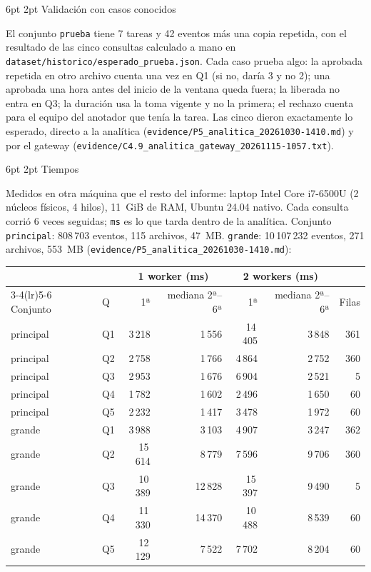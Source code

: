 \documentclass[10pt,letterpaper]{article}
\makeatletter
\newcommand{\ev}[1]{{\footnotesize\texttt{evidence/\allowbreak #1}}}
\renewcommand\subsection{\@startsection{subsection}{2}{\z@}%
  {6pt \@plus 1pt}{2pt}%
  {\normalfont\normalsize\bfseries\color{acc}}}
\makeatother
\begin{document}
\subsection{Validación con casos conocidos}

El conjunto \texttt{prueba} tiene 7 tareas y 42 eventos más una copia repetida, con el resultado de las cinco
consultas calculado a mano en \texttt{dataset/historico/esperado\_prueba.json}. Cada caso prueba algo: la
aprobada repetida en otro archivo cuenta una vez en Q1 (si no, daría 3 y no 2); una aprobada una hora antes del
inicio de la ventana queda fuera; la liberada no entra en Q3; la duración usa la toma vigente y no la primera;
el rechazo cuenta para el equipo del anotador que tenía la tarea. Las cinco dieron exactamente lo esperado,
directo a la analítica (\ev{P5\_analitica\_20261030-1410.md}) y por el gateway
(\ev{C4.9\_analitica\_gateway\_20261115-1057.txt}).

\subsection{Tiempos}

Medidos en otra máquina que el resto del informe: laptop Intel Core i7-6500U (2 núcleos físicos, 4 hilos),
11~GiB de RAM, Ubuntu 24.04 nativo. Cada consulta corrió 6 veces seguidas; \texttt{ms} es lo que tarda dentro
de la analítica. Conjunto \texttt{principal}: 808\,703 eventos, 115 archivos, 47~MB. \texttt{grande}:
10\,107\,232 eventos, 271 archivos, 553~MB (\ev{P5\_analitica\_20261030-1410.md}):

\begin{center}\footnotesize
\begin{tabular}{@{}llrrrrr@{}}
\toprule
 & & \multicolumn{2}{c}{1 worker (ms)} & \multicolumn{2}{c}{2 workers (ms)} & \\
\cmidrule(lr){3-4}\cmidrule(lr){5-6}
Conjunto & Q & 1ª & mediana 2ª--6ª & 1ª & mediana 2ª--6ª & Filas \\
\midrule
principal & Q1 & 3\,218 & 1\,556 & 14\,405 & 3\,848 & 361 \\
principal & Q2 & 2\,758 & 1\,766 & 4\,864 & 2\,752 & 360 \\
principal & Q3 & 2\,953 & 1\,676 & 6\,904 & 2\,521 & 5 \\
principal & Q4 & 1\,782 & 1\,602 & 2\,496 & 1\,650 & 60 \\
principal & Q5 & 2\,232 & 1\,417 & 3\,478 & 1\,972 & 60 \\
\midrule
grande & Q1 & 3\,988 & 3\,103 & 4\,907 & 3\,247 & 362 \\
grande & Q2 & 15\,614 & 8\,779 & 7\,596 & 9\,706 & 360 \\
grande & Q3 & 10\,389 & 12\,828 & 15\,397 & 9\,490 & 5 \\
grande & Q4 & 11\,330 & 14\,370 & 10\,488 & 8\,539 & 60 \\
grande & Q5 & 12\,129 & 7\,522 & 7\,702 & 8\,204 & 60 \\
\bottomrule
\end{tabular}
\end{center}
\end{document}
